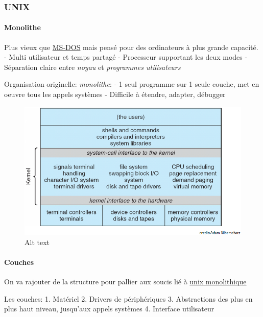 \subsubsection{UNIX}\label{unix}

\paragraph{Monolithe}\label{monolithe}

Plus vieux que \hyperref[ms-dos]{MS-DOS} mais pensé pour des ordinateurs
à plus grande capacité. - Multi utilisateur et temps partagé -
Processeur supportant les deux modes - Séparation claire entre
\emph{noyau} et \emph{programmes utilisateurs}

Organisation originelle: \emph{monolithe}: - 1 seul programme sur 1
seule couche, met en oeuvre tous les appels systèmes - Difficile à
étendre, adapter, débugger

\begin{figure}
\centering
\includegraphics{image-18.png}
\caption{Alt text}
\end{figure}

\paragraph{Couches}\label{couches}

On va rajouter de la structure pour pallier aux soucis lié à
\hyperref[monolithe]{unix monolithique}

Les couches: 1. Matériel 2. Drivers de périphériques 3. Abstractions des
plus en plus haut niveau, jusqu'aux appels systèmes 4. Interface
utilisateur

